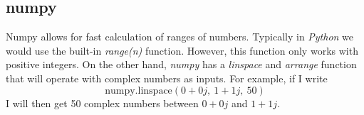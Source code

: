 \documentclass{article}
\begin{document}
        \subsection{numpy}
        Numpy allows for fast calculation of ranges of numbers. Typically in \textit{Python} we would use the built-in \textit{range(n)} function. However, this function only works with positive integers. On the other hand, \textit{numpy} has a \textit{linspace} and \textit{arrange} function that will operate with complex numbers as inputs. For example, if I write
        $$\text{numpy.linspace}(0+0j,\ 1+1j,\ 50)$$
        I will then get 50 complex numbers between $0+0j$ and $1+1j$.
    
\end{document}
